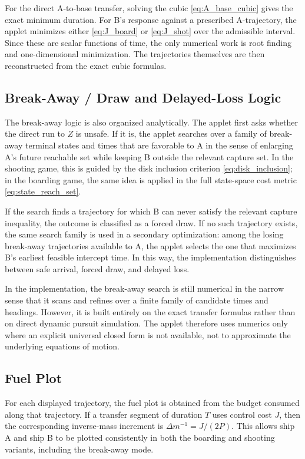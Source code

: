 \documentclass[journal, a4paper]{IEEEtran}
\begin{document}
For the direct A-to-base transfer, solving the cubic \eqref{eq:A_base_cubic} gives the exact minimum duration. For B's response against a prescribed A-trajectory, the applet minimizes either \eqref{eq:J_board} or \eqref{eq:J_shot} over the admissible interval. Since these are scalar functions of time, the only numerical work is root finding and one-dimensional minimization. The trajectories themselves are then reconstructed from the exact cubic formulas.

\subsection{Break-Away / Draw and Delayed-Loss Logic}
The break-away logic is also organized analytically. The applet first asks whether the direct run to $Z$ is unsafe. If it is, the applet searches over a family of break-away terminal states and times that are favorable to A in the sense of enlarging A's future reachable set while keeping B outside the relevant capture set. In the shooting game, this is guided by the disk inclusion criterion \eqref{eq:disk_inclusion}; in the boarding game, the same idea is applied in the full state-space cost metric \eqref{eq:state_reach_set}.

If the search finds a trajectory for which B can never satisfy the relevant capture inequality, the outcome is classified as a forced draw. If no such trajectory exists, the same search family is used in a secondary optimization: among the losing break-away trajectories available to A, the applet selects the one that maximizes B's earliest feasible intercept time. In this way, the implementation distinguishes between safe arrival, forced draw, and delayed loss.

In the implementation, the break-away search is still numerical in the narrow sense that it scans and refines over a finite family of candidate times and headings. However, it is built entirely on the exact transfer formulas rather than on direct dynamic pursuit simulation. The applet therefore uses numerics only where an explicit universal closed form is not available, not to approximate the underlying equations of motion.

\subsection{Fuel Plot}
For each displayed trajectory, the fuel plot is obtained from the budget consumed along that trajectory. If a transfer segment of duration $T$ uses control cost $J$, then the corresponding inverse-mass increment is $\Delta m^{-1}=J/(2P)$. This allows ship A and ship B to be plotted consistently in both the boarding and shooting variants, including the break-away mode.
\end{document}
